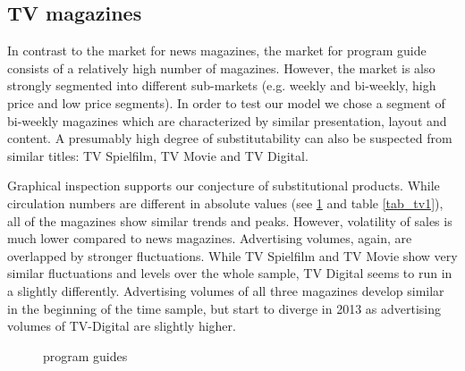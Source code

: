 \documentclass[12pt,a4paper]{scrreprt}
\begin{document}
\subsection{TV magazines}

In contrast to the market for news magazines, the market for program guide consists of a relatively high number of magazines. However, the market is also strongly segmented into different sub-markets (e.g. weekly and bi-weekly, high price and low price segments). In order to test our model we chose a segment of bi-weekly magazines which are characterized by similar presentation, layout and content. A presumably high degree of substitutability can also be suspected from similar titles: TV Spielfilm, TV Movie and TV Digital.  

Graphical inspection supports our conjecture of substitutional products. While circulation numbers are different in absolute values (see \ref{fig_tv1} and table \ref{tab_tv1}), all of the magazines show similar trends and peaks. However, volatility of sales is much lower compared to news magazines. Advertising volumes, again, are overlapped by stronger fluctuations. While TV Spielfilm and TV Movie show very similar fluctuations and levels over the whole sample, TV Digital seems to run in a slightly differently. Advertising volumes of all three magazines develop similar in the beginning of the time sample, but start to diverge in 2013 as advertising volumes of TV-Digital are slightly higher. 

\begin{figure}[H]
\caption{program guides}
\begin{minipage}
	\centering
	
\end{minipage}
\hfil
\begin{minipage}
	\centering
	
\end{minipage}
\label{fig_tv1}
\end{figure}
\end{document}
